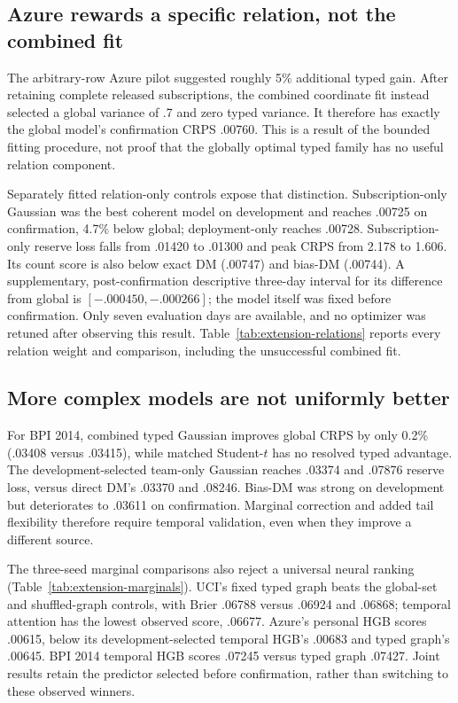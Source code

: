 \subsection{Azure rewards a specific relation, not the combined fit}
The arbitrary-row Azure pilot suggested roughly 5\% additional typed gain.
After retaining complete released subscriptions, the combined coordinate
fit instead selected a global variance of .7 and zero typed variance.
It therefore has exactly the global model's confirmation CRPS .00760.
This is a result of the bounded fitting procedure, not proof that the
globally optimal typed family has no useful relation component.

Separately fitted relation-only controls expose that distinction.
Subscription-only Gaussian was the best coherent model on development and
reaches .00725 on confirmation, 4.7\% below global; deployment-only reaches
.00728. Subscription-only reserve loss falls from .01420 to .01300 and
peak CRPS from 2.178 to 1.606. Its count score is also below exact DM
(.00747) and bias-DM (.00744). A supplementary, post-confirmation descriptive
three-day interval for its difference from global is
$[-.000450,-.000266]$; the model itself was fixed before confirmation.
Only seven evaluation days are available, and no optimizer was retuned
after observing this result. Table~\ref{tab:extension-relations} reports every
relation weight and comparison, including the unsuccessful combined fit.

\subsection{More complex models are not uniformly better}
For BPI 2014, combined typed Gaussian improves global CRPS by only 0.2\%
(.03408 versus .03415), while matched Student-$t$ has no resolved typed
advantage. The development-selected team-only Gaussian reaches .03374 and
.07876 reserve loss, versus direct DM's .03370 and .08246. Bias-DM was strong
on development but deteriorates to .03611 on confirmation. Marginal correction
and added tail flexibility therefore require temporal validation, even when
they improve a different source.

The three-seed marginal comparisons also reject a universal neural ranking
(Table~\ref{tab:extension-marginals}). UCI's fixed typed graph beats the
global-set and shuffled-graph controls, with Brier .06788 versus .06924
and .06868; temporal attention has the lowest observed score, .06677.
Azure's personal HGB scores .00615, below its development-selected temporal
HGB's .00683 and typed graph's .00645. BPI 2014 temporal HGB scores .07245
versus typed graph .07427. Joint results retain the predictor selected before
confirmation, rather than switching to these observed winners.

